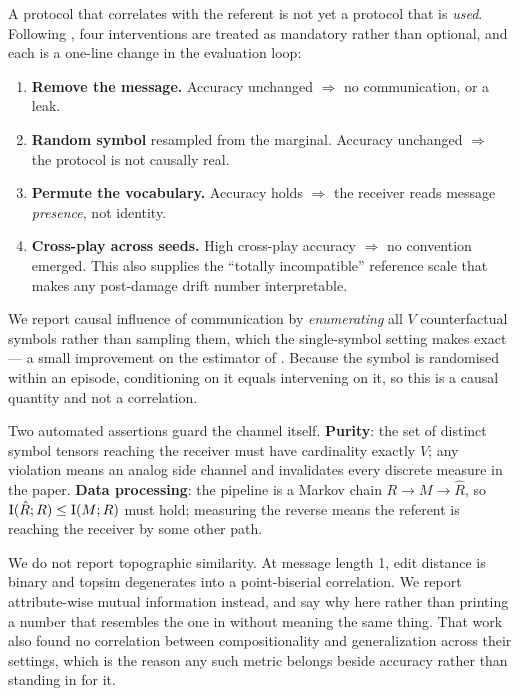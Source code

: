 A protocol that correlates with the referent is not yet a protocol that is
\emph{used}. Following \citet{lowe2019pitfalls}, four interventions are treated
as mandatory rather than optional, and each is a one-line change in the
evaluation loop:

\begin{enumerate}\itemsep2pt
\item \textbf{Remove the message.} Accuracy unchanged $\Rightarrow$ no
  communication, or a leak.
\item \textbf{Random symbol} resampled from the marginal. Accuracy unchanged
  $\Rightarrow$ the protocol is not causally real.
\item \textbf{Permute the vocabulary.} Accuracy holds $\Rightarrow$ the receiver
  reads message \emph{presence}, not identity.
\item \textbf{Cross-play across seeds.} High cross-play accuracy $\Rightarrow$ no
  convention emerged. This also supplies the ``totally incompatible'' reference
  scale that makes any post-damage drift number interpretable.
\end{enumerate}

We report causal influence of communication by \emph{enumerating} all $V$
counterfactual symbols rather than sampling them, which the single-symbol setting
makes exact --- a small improvement on the estimator of \citet{lowe2019pitfalls}.
Because the symbol is randomised within an episode, conditioning on it equals
intervening on it, so this is a causal quantity and not a correlation.

Two automated assertions guard the channel itself. \textbf{Purity}: the set of
distinct symbol tensors reaching the receiver must have cardinality exactly $V$;
any violation means an analog side channel and invalidates every discrete measure
in the paper. \textbf{Data processing}: the pipeline is a Markov chain
$R \to M \to \hat{R}$, so $\mathrm{I}(\hat{R};R) \leq \mathrm{I}(M;R)$ must hold; measuring the
reverse means the referent is reaching the receiver by some other path.

We do not report topographic similarity. At message length 1, edit distance is
binary and topsim degenerates into a point-biserial correlation. We report
attribute-wise mutual information instead, and say why here rather than printing
a number that resembles the one in \citet{chaabouni2020compositionality} without
meaning the same thing. That work also found no correlation between
compositionality and generalization across their settings, which is the reason
any such metric belongs beside accuracy rather than standing in for it.

